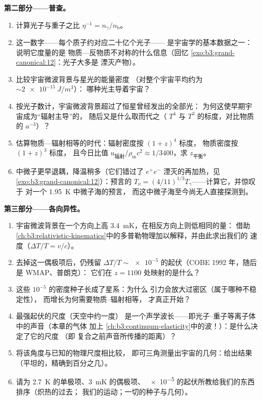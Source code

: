 \begin{problem}
\medskip\noindent\textbf{第二部分——普查。}
\begin{enumerate}[resume]
  \item 计算光子与重子之比 $\eta^{-1} =
        n_\gamma/n_{\text{b}}$。
  \item 这一数字——每个质子约对应二十亿个光子——
        是宇宙学的基本数据之一：说明它度量的是
        物质—反物质不对称的什么信息（回忆
        \cref{exo:b3:grand-canonical:12}：光子大多是
        湮灭产物）。
  \item 比较宇宙微波背景与星光的能量密度
        （对整个宇宙平均约为 $\sim\qty{2e-15}{J/m^3}$）：
        哪种光主导着宇宙？
  \item 按光子数计，宇宙微波背景超过了恒星曾经发出的全部光：
        为何这使早期宇宙成为“辐射主导”的，
        随后又是什么取而代之（
        $T^4$ 与 $T^3$ 的标度，对比物质的 $a^{-3}$）？
  \item 估算物质—辐射相等的时代：辐射密度按 $(1+z)^4$ 标度，
        物质密度按 $(1+z)^3$ 标度，
        且今日比值
        $u_{\text{辐射}}/\rho_{\text{m}}c^2 \approx 1/3400$，求
        $z_{\text{平衡}}$。
  \item 中微子更早退耦，降温稍多（它们错过了
        $e^+e^-$ 湮灭的再加热，见
        \cref{exo:b3:grand-canonical:12}）：预言的
        $T_\nu = (4/11)^{1/3}T_\gamma$——计算它，并惊叹于
        对一个 \qty{1.95}{K} 中微子海的预言，
        而这中微子海至今尚无人直接探测到。
\end{enumerate}

\medskip\noindent\textbf{第三部分——各向异性。}
\begin{enumerate}[resume]
  \item 宇宙微波背景在一个方向上高 \qty{3.4}{mK}，在相反方向上则低相同的量：
        借助
        \cref{ch:b3:relativistic-kinematics}中的多普勒物理加以解释，并由此求出我们的
        速度（$\Delta T/T = v/c$）。
  \item 去掉这一偶极项后，仍残留 $\Delta T/T \sim
        \num{e-5}$ 的起伏（COBE 1992 年，随后是 WMAP、普朗克）：
        它们在 $z = 1100$ 处映射的是什么？
  \item 这些 $10^{-5}$ 的密度种子长成了星系：为什么
        引力会放大过密区（属于哪种不稳定性），
        而增长为何需要物质–辐射相等，
        才真正开始？
  \item 最强起伏的尺度（天空中约一度）
        是一个声学波长——即光子–重子等离子体中的声音（本章的气体
        加上
        \cref{ch:b3:continuum-elasticity}中的波！）：是什么决定了它的尺度
        （即
        复合之前声音所传播的距离）？
  \item 将该角度与已知的物理尺度相比较，
        即可三角测量出宇宙的几何：给出结果
        （平坦的，精确到百分之几）。
  \item 请为 \qty{2.7}{K} 的单极项、\qty{3}{mK} 的偶极项、
        \num{e-5} 的起伏所教给我们的东西排序（炽热的过去；
        我们的运动；一切的种子与几何）。
\end{enumerate}


\end{problem}

